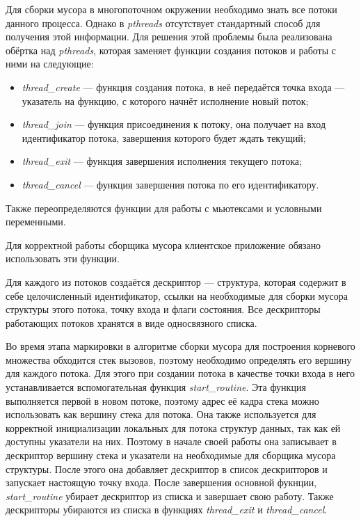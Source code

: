 \documentclass[14pt]{matmex-diploma}
\begin{document}
Для сборки мусора в многопоточном окружении необходимо знать все потоки данного процесса. Однако в \textit{pthreads} отсутствует стандартный способ для получения этой информации.
Для решения этой проблемы была реализована обёртка над \textit{pthreads}, которая заменяет функции создания потоков и работы с ними на следующие:
\begin{itemize}
\item \textit{thread\_create} --- функция создания потока, в неё передаётся
точка входа --- указатель на функцию, с которого начнёт исполнение новый поток;
\item \textit{thread\_join} --- функция присоединения к потоку, она получает на вход идентификатор потока, завершения которого будет ждать текущий;
\item \textit{thread\_exit} --- функция завершения исполнения текущего потока;
\item \textit{thread\_cancel} --- функция завершения потока по его идентификатору.
\end{itemize}

Также переопределяются функции для работы с мьютексами и условными переменными.

Для корректной работы сборщика мусора клиентское приложение обязано использовать эти функции.

Для каждого из потоков создаётся дескриптор --- структура, которая содержит
в себе целочисленный идентификатор, ссылки на необходимые для сборки мусора
структуры этого потока, точку входа и флаги состояния. Все дескрипторы работающих потоков хранятся в виде односвязного списка.

Во время этапа маркировки в алгоритме сборки мусора для построения корневого множества обходится стек вызовов, поэтому необходимо определять его вершину для каждого потока.  Для этого при создании потока в качестве точки входа в него устанавливается вспомогательная функция \textit{start\_routine}. Эта функция выполняется первой в новом потоке, поэтому адрес её кадра стека можно использовать как вершину стека для потока. Она также используется для корректной инициализации локальных для потока структур данных, так как ей доступны указатели на них. Поэтому в начале своей работы она записывает в дескриптор вершину стека и указатели на необходимые для сборщика мусора структуры. После этого она добавляет дескриптор
в список дескрипторов и запускает настоящую точку входа. После завершения основной фукнции, 
 \textit{start\_routine} убирает дескриптор из списка и завершает свою работу.
Также дескрипторы убираются из списка в функциях \textit{thread\_exit} и \textit{thread\_cancel}.
\end{document}
